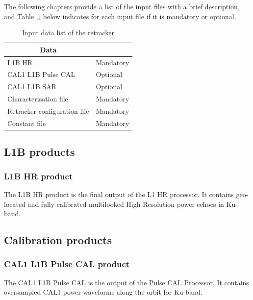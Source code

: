 \documentclass[11pt,a4paper]{article}
\begin{document}
The following chapters provide a list of the input files with a brief description, and Table~\ref{tab:input_data} below indicates for each input file if it is mandatory or optional.

\begin{table}[ht!]
     \centering 
     \caption[Input data list of the retracker]{Input data list of the retracker}\label{tab:input_data}
\begin{tabular}{|m{}|m{}|}
\hline
  \multicolumn{1}{c}{\cellcolor{dark_red} \color{white}\textbf{Data}} & \multicolumn{1}{c}{\cellcolor{dark_red} \color{white}\textbf{}} \\
  \hline
  L1B HR & Mandatory \\
CAL1 L1B Pulse CAL & Optional \\
  CAL1 L1B SAR & Optional \\
  Characterisation file & Mandatory \\
  Retracker configuration file & Mandatory \\
  Constant file & Mandatory \\
  \hline
\end{tabular}
\end{table}



\subsection{L1B products}\label{sec:l1b_products}


\subsubsection{L1B HR product}

The L1B HR product is the final output of the L1 HR processor. It contains geo-located and fully calibrated multilooked High Resolution power echoes in Ku-band.


\subsection{Calibration products}\label{sec:l1bcal_products}

\subsubsection{CAL1 L1B Pulse CAL product}

The CAL1 L1B Pulse CAL is the output of the Pulse CAL Processor. It contains oversampled CAL1 power waveforms along the orbit for Ku-band.
 
\end{document}
